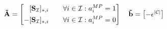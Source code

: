 \begin{equation*}
    \bold{\tilde{A}} = 
    \left[\begin{aligned}
        & [\bold S_{\mathcal{I}}]_{*,i} \quad &\forall i \in \mathcal{I}: a_i^{MP} = 1\\
        - & [\bold S_{\mathcal{I}}]_{*,i} \quad &\forall i \in \mathcal{I}: a_i^{MP} = 0\\
    \end{aligned}\right]  
    \quad \bold{\tilde{b}} = \left[\begin{aligned}
        -&\epsilon^{|\mathcal{C}|} \\
    \end{aligned}\right]
\end{equation*} 




